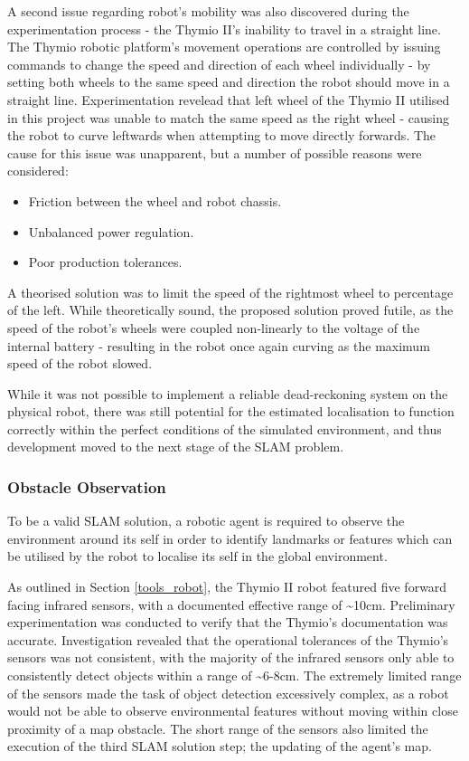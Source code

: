 A second issue regarding robot's mobility was also discovered during the
experimentation process - the Thymio II's inability to travel in a straight
line.  
The Thymio robotic platform's movement operations are controlled by issuing
commands to change the speed and direction of each wheel individually - by
setting both wheels to the same speed and direction the robot should move in a
straight line.
Experimentation revelead that left wheel of the Thymio II utilised in this
project was unable to match the same speed as the right wheel - causing the
robot to curve leftwards when attempting to move directly forwards.
The cause for this issue was unapparent, but a number of possible reasons were
considered:

\begin{itemize}
\item Friction between the wheel and robot chassis.
\item Unbalanced power regulation.
\item Poor production tolerances.
\end{itemize}

A theorised solution was to limit the speed of the rightmost wheel to
percentage of the left.
While theoretically sound, the proposed solution proved futile, as the speed of
the robot's wheels were coupled non-linearly to the voltage of the internal
battery - resulting in the robot once again curving as the maximum speed of
the robot slowed.

While it was not possible to implement a reliable dead-reckoning
system on the physical robot, there was still potential for the estimated
localisation to function correctly within the perfect conditions of the
simulated environment, and thus development moved to the next stage of the
SLAM problem.

\subsubsection{Obstacle Observation}
To be a valid SLAM solution, a robotic agent is required to observe the
environment around its self in order to identify landmarks or features which
can be utilised by the robot to localise its self in the global environment.

As outlined in Section \ref{tools_robot}, the Thymio II robot featured five
forward facing infrared sensors, with a documented effective range of \~{}10cm.
Preliminary experimentation was conducted to verify that the Thymio's
documentation was accurate.
Investigation revealed that the operational tolerances of the Thymio's sensors
was not consistent, with the majority of the infrared sensors only able to
consistently detect objects within a range of \~{}6-8cm.
The extremely limited range of the sensors made the task of object detection
excessively complex, as a robot would not be able to observe environmental
features without moving within close proximity of a map obstacle.
The short range of the sensors also limited the execution of the third SLAM
solution step; the updating of the agent's map.

